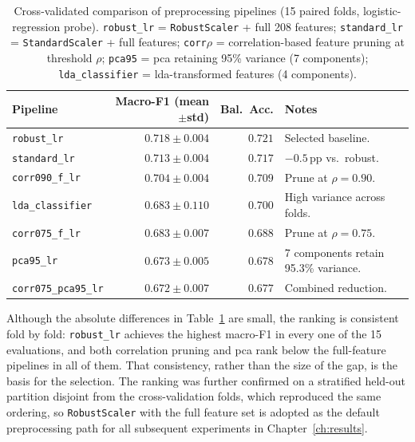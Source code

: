 \begin{table}[htbp]
\centering
\caption[Cross-validated comparison of preprocessing pipelines]{Cross-validated comparison of preprocessing pipelines (15 paired folds, logistic-regression probe). \texttt{robust\_lr} = \texttt{RobustScaler} + full 208 features; \texttt{standard\_lr} = \texttt{StandardScaler} + full features; \texttt{corr$\rho$} = correlation-based feature pruning at threshold $\rho$; \texttt{pca95} = \gls{pca} retaining 95\% variance (7 components); \texttt{lda\_classifier} = \gls{lda}-transformed features (4 components).}
\label{tab:eda-pipelines}
\small
\begin{tabularx}{\textwidth}{@{}l r r X@{}}
\toprule
\textbf{Pipeline} & \textbf{Macro-F1 (mean$\pm$std)} & \textbf{Bal.\ Acc.} & \textbf{Notes} \\
\midrule
\texttt{robust\_lr}        & $\mathbf{0.718 \pm 0.004}$ & $\mathbf{0.721}$ & Selected baseline. \\
\midrule
\texttt{standard\_lr}      & $0.713 \pm 0.004$ & $0.717$ & $-0.5$\,pp vs.\ robust. \\
\midrule
\texttt{corr090\_f\_lr}    & $0.704 \pm 0.004$ & $0.709$ & Prune at $\rho = 0.90$. \\
\midrule
\texttt{lda\_classifier}   & $0.683 \pm 0.110$ & $0.700$ & High variance across folds. \\
\midrule
\texttt{corr075\_f\_lr}    & $0.683 \pm 0.007$ & $0.688$ & Prune at $\rho = 0.75$. \\
\midrule
\texttt{pca95\_lr}         & $0.673 \pm 0.005$ & $0.678$ & 7 components retain 95.3\% variance. \\
\midrule
\texttt{corr075\_pca95\_lr} & $0.672 \pm 0.007$ & $0.677$ & Combined reduction. \\
\bottomrule
\end{tabularx}
\end{table}

Although the absolute differences in Table~\ref{tab:eda-pipelines} are small, the ranking is consistent fold by fold: \texttt{robust\_lr} achieves the highest macro-F1 in every one of the 15 evaluations, and both correlation pruning and \gls{pca} rank below the full-feature pipelines in all of them. That consistency, rather than the size of the gap, is the basis for the selection. The ranking was further confirmed on a stratified held-out partition disjoint from the cross-validation folds, which reproduced the same ordering, so \texttt{RobustScaler} with the full feature set is adopted as the default preprocessing path for all subsequent experiments in Chapter~\ref{ch:results}.

